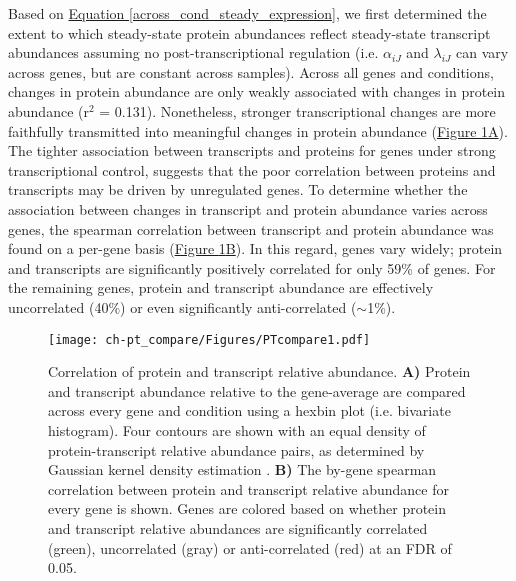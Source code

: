 Based on \hyperref[across_cond_steady_expression]{Equation \ref{across_cond_steady_expression}}, we first determined the extent to which steady-state protein abundances reflect steady-state transcript abundances assuming no post-transcriptional regulation (i.e. $\alpha_{iJ}$ and $\lambda_{iJ}$ can vary across genes, but are constant across samples).  Across all genes and conditions, changes in protein abundance are only weakly associated with changes in protein abundance (r$^{2}$ = 0.131). Nonetheless, stronger transcriptional changes are more faithfully transmitted into meaningful changes in protein abundance (\hyperref[ptscatter]{Figure \ref{ptscatter}A}).  The tighter association between transcripts and proteins for genes under strong transcriptional control, suggests that the poor correlation between proteins and transcripts may be driven by unregulated genes. To determine whether the association between changes in transcript and protein abundance varies across genes, the spearman correlation between transcript and protein abundance was found on a per-gene basis (\hyperref[ptscatter]{Figure \ref{ptscatter}B}). In this regard, genes vary widely; protein and transcripts are significantly positively correlated for only 59\% of genes. For the remaining genes, protein and transcript abundance are effectively uncorrelated (40\%) or even significantly anti-correlated ($\sim$1\%).

\begin{figure}[h!]
\begin{center}
\texttt{[image: ch-pt\_compare/Figures/PTcompare1.pdf]}
\caption[Correlation of protein and transcript relative abundance]{Correlation of protein and transcript relative abundance.  \textbf{A)} Protein and transcript abundance relative to the gene-average are compared across every gene and condition using a hexbin plot (i.e. bivariate histogram).  Four contours are shown with an equal density of protein-transcript relative abundance pairs, as determined by Gaussian kernel density estimation \cite{Anonymous:nXZxIOcv}.  \textbf{B)} The by-gene spearman correlation between protein and transcript relative abundance for every gene is shown.  Genes are colored based on whether protein and transcript relative abundances are significantly correlated (green), uncorrelated (gray) or anti-correlated (red) at an FDR of 0.05.}
\label{ptscatter}
\end{center}
\end{figure}

